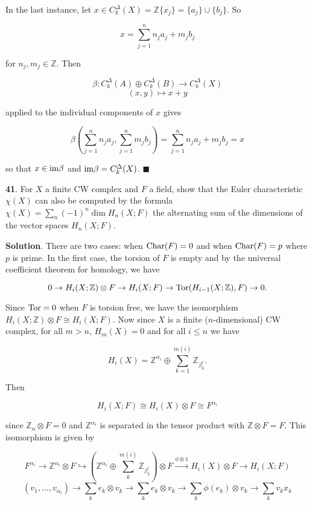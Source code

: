 \documentclass{article}
\newcommand{\Z}{\mathbb{Z}}
\newcommand{\identity}{\mathds{1}}
\newcommand{\Tor}{\textnormal{Tor}}
\newcommand{\Char}{\textnormal{Char}}
\newcommand{\im}{\textnormal{im}}
\begin{document}
In the last instance, let $x\in C_{k}^{\Delta}(X) = \Z\{x_{j}\} = \{a_{j}\}\cup \{b_{j}\}$. So

$$x = \sum_{j=1}^{n}n_{j}a_{j} + m_{j}b_{j}$$

for $n_{j},m_{j}\in \Z$. Then

$$\beta: C_{k}^{\Delta}(A)\oplus C_{k}^{\Delta}(B)\to C_{k}^{\Delta}(X)$$
$$(x, y)\mapsto x + y$$

applied to the individual components of $x$ gives

$$\beta\left(\sum_{j=1}^{n}n_{j}a_{j}, \sum_{j=1}^{n}m_{j}b_{j}\right) = \sum_{j=1}^{n}n_{j}a_{j} + m_{j}b_{j} = x$$

so that $x\in \im \beta$ and $\im \beta = C_{k}^{\Delta}(X)$. $\blacksquare$
\bigskip
\bigskip

\textbf{41}. For $X$ a finite CW complex and $F$ a field, show that the Euler characteristic $\chi(X)$ can also be computed by the formula $\chi(X) = \sum_{n}(-1)^{n} \dim H_{n}(X;F)$ the alternating sum of the dimensions of the vector spaces $H_{n}(X;F)$.
\medskip

\textbf{Solution}. There are two cases: when $\Char(F) = 0$ and when $\Char(F) = p$ where $p$ is prime. In the first case, the torsion of $F$ is empty and by the universal coefficient theorem for homology, we have

$$0\to H_{i}(X; \Z)\otimes F\to H_{i}(X; F)\to \Tor(H_{i-1}(X; \Z), F)\to 0.$$

Since $\Tor = 0$ when $F$ is torsion free, we have the isomorphism $H_{i}(X; \Z)\otimes F\cong H_{i}(X; F)$. Now since $X$ is a finite ($n$-dimensional) CW complex, for all $m > n$, $H_{m}(X) = 0$ and for all $i\leq n$ we have

$$H_{i}(X) = \Z^{\alpha_{i}}\oplus \sum_{k=1}^{m(i)} \Z_{\beta_{k}^{i}}.$$

Then

$$H_{i}(X; F)\cong H_{i}(X)\otimes F\cong F^{\alpha_{i}}$$

since $\Z_{n}\otimes F = 0$ and $\Z^{\alpha_{i}}$ is separated in the tensor product with $\Z\otimes F = F$. This isomorphism is given by

$$F^{\alpha_{i}}\to \Z^{\alpha_{i}}\otimes F\hookrightarrow \left(\Z^{\alpha_{i}}\oplus \sum_{k}^{m(i)} \Z_{\beta_{k}^{i}}\right)\otimes F\xrightarrow{\phi\otimes \identity} H_{i}(X)\otimes F\to H_{i}(X; F)$$
$$(v_{1},\ldots, v_{\alpha_{i}})\to \sum_{k}e_{k}\otimes v_{k}\to \sum_{k}e_{k}\otimes v_{k}\to \sum_{k}\phi(e_{k})\otimes v_{k}\to \sum_{k} v_{k}x_{k}$$
\end{document}
